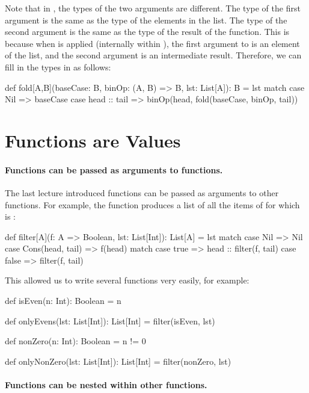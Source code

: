 \documentclass{book}
\begin{document}
Note that in , the types of the two arguments
are different. The type of the first argument is the same as the
type of the elements in the list. The type of the second argument
is the same as the type of the result of the function. This is because
when  is applied (internally within ),
the first argument to   is an element of the
list, and the second argument is an intermediate result.
Therefore, we can fill in the types in  as follows:
%
\begin{scalacode}
def fold[A,B](baseCase: B, binOp: (A, B) => B, lst: List[A]): B = lst match {
  case Nil => baseCase
  case head :: tail => binOp(head, fold(baseCase, binOp, tail))
}
\end{scalacode}

\section{Functions are Values}

\paragraph{Functions can be passed as arguments to functions.}
The last lecture introduced functions can be passed as arguments
to other functions. For example, the function 
produces a list of all the items of  for which 
is :
%
\begin{scalacode}
def filter[A](f: A => Boolean, lst: List[Int]): List[A] = lst match {
  case Nil => Nil
  case Cons(head, tail) =>
    f(head) match {
      case true => head :: filter(f, tail)
      case false => filter(f, tail)
    }
}
\end{scalacode}

This allowed us to write several functions very easily, for example:
%
\begin{scalacode}
def isEven(n: Int): Boolean = n %

def onlyEvens(lst: List[Int]): List[Int] = {
  filter(isEven, lst)
}

def nonZero(n: Int): Boolean = n != 0

def onlyNonZero(lst: List[Int]): List[Int] = {
  filter(nonZero, lst)
}
\end{scalacode}

\paragraph{Functions can be nested within other functions.}
\end{document}
